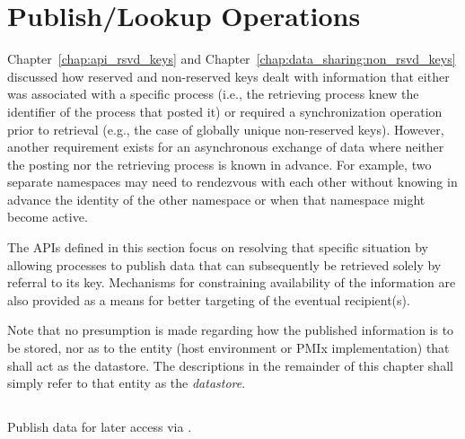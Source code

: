 \chapter{Publish/Lookup Operations}
\label{chap:pub}

Chapter~\ref{chap:api_rsvd_keys} and Chapter~\ref{chap:data_sharing:non_rsvd_keys} 
discussed how reserved and non-reserved keys dealt with
information that either was associated with a specific process (i.e., the
retrieving process knew the identifier of the process that posted it) or
required a synchronization operation prior to retrieval (e.g., the case of
globally unique non-reserved keys). However, another requirement exists for an
asynchronous exchange of data where neither the posting nor the retrieving
process is known in advance. For example, two separate namespaces may need to
rendezvous with each other without knowing in advance the identity of the other
namespace or when that namespace might become active.

The \acp{API} defined in this section focus on resolving that specific
situation by allowing processes to publish data that can subsequently be
retrieved solely by referral to its key. Mechanisms for constraining
availability of the information are also provided as a means for better
targeting of the eventual recipient(s).

Note that no presumption is made regarding how the published information is to be stored, nor as to the entity (host environment or \ac{PMIx} implementation) that shall act as the datastore. The descriptions in the remainder of this chapter shall simply refer to that entity as the \emph{datastore}.


\section{}

\summary

Publish data for later access via .

\format


